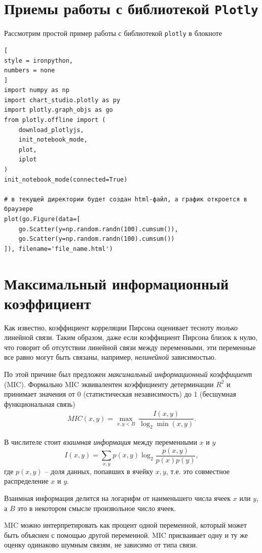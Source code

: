 \documentclass[%
	11pt,
	a4paper,
	utf8,
		]{article}
\begin{document}
\section{Приемы работы с библиотекой \texttt{Plotly}}

Рассмотрим простой пример работы с библиотекой \texttt{plotly} в блокноте
\begin{lstlisting}[
style = ironpython,
numbers = none
]
import numpy as np
import chart_studio.plotly as py
import plotly.graph_objs as go
from plotly.offline import (
    download_plotlyjs,
    init_notebook_mode,
    plot,
    iplot
)
init_notebook_mode(connected=True)

# в текущей директории будет создан html-файл, а график откроется в браузере
plot(go.Figure(data=[
    go.Scatter(y=np.random.randn(100).cumsum()),
    go.Scatter(y=np.random.randn(100).cumsum())
]), filename='file_name.html')
\end{lstlisting}

\section{Максимальный информационный коэффициент}

Как известно, коэффициент корреляции Пирсона оценивает тесноту \emph{только} линейной связи. Таким образом, даже если коэффициент Пирсона близок к нулю, что говорит об отсутствии линейной связи между переменными, эти переменные все равно могут быть связаны, например, \emph{нелинейной} зависимостью.

По этой причине был предложен \emph{максимальный информационный коэффициент} (MIC). Формально MIC эквивалентен коэффициенту детерминации $ R^2 $ и принимает значения от 0 (статистическая независимость) до 1 (бесшумная функциональная связь)
\begin{align*}
	MIC(x, y) = \max\limits_{x,y < B}\ \dfrac{I(x, y)}{\log_2 \min (x, y)}.
\end{align*}

В числителе стоит \emph{взаимная информация} между переменными $ x $ и $ y $
$$
    I(x, y) = \sum_{x,y}p(x,y) \log_2 \dfrac{p(x,y)}{p(x)p(y)},
$$
где $ p(x,y) $ -- доля данных, попавших в ячейку $ x, y $, т.е. это совместное распределение $ x $ и $ y $.

Взаимная информация делится на логарифм от наименьшего числа ячеек $ x $ или $ y $, а $ B $ это в некотором смысле произвольное число ячеек.

MIC можно интерпретировать как процент одной переменной, который может быть объяснен с помощью другой переменной. MIC присваивает одну и ту же оценку одинаково шумным связям, не зависимо от типа связи.
\end{document}
